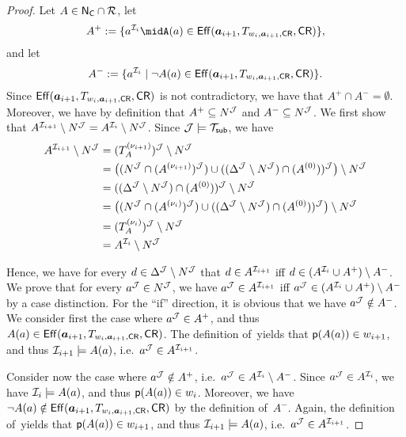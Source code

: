 \begin{proof}
    Let $A\in\mathsf{N_C}\cap\mathcal{R}$, let
    \[A^+:=\{a^{\Imc_i}\mid%
        A(a)\in\Eff(\abf_{i+1},T_{w_i,\abf_{i+1},\CR},\CR)\},\]
    and let
    \[A^-:=\{a^{\Imc_i}\mid%
        \lnot A(a)\in\Eff(\abf_{i+1},T_{w_i,\abf_{i+1},\CR},\CR)\}.\]
    Since $\operatorname{\mathsf{Eff}}(\boldsymbol a_{i+1},T_{w_i,\boldsymbol a_{i+1},\mathsf{CR}},\mathsf{CR})$ is not contradictory, we
    have that $A^+\cap A^-=\emptyset$.  Moreover, we have by definition that
    $A^+\subseteq N^\mathcal{J}$ and $A^-\subseteq N^\mathcal{J}$.
    We first show that
    $A^{\mathcal{I}_{i+1}}\setminus N^\mathcal{J}=A^{\mathcal{I}_i}\setminus N^\mathcal{J}$.  Since
    $\mathcal{J}\models\mathcal{T}_\mathsf{sub}$, we have
    \begin{align*}
        A^{\mathcal{I}_{i+1}}\setminus N^\mathcal{J}
        &=(T_A^{(\nu_{i+1})})^\mathcal{J}\setminus N^\mathcal{J}\\
        &=\bigl((N^\mathcal{J}\cap(A^{(\nu_{i+1})})^\mathcal{J})\cup((\Delta^\mathcal{J}\setminus N^\mathcal{J})\cap(A^{(0)}))^\mathcal{J}\bigr)\setminus N^\mathcal{J}\\
        &=((\Delta^\mathcal{J}\setminus N^\mathcal{J})\cap(A^{(0)}))^\mathcal{J}\setminus N^\mathcal{J}\\
        &=\bigl((N^\mathcal{J}\cap(A^{(\nu_{i})})^\mathcal{J})\cup((\Delta^\mathcal{J}\setminus N^\mathcal{J})\cap(A^{(0)}))^\mathcal{J}\bigr)\setminus N^\mathcal{J}\\
        &=(T_A^{(\nu_{i})})^\mathcal{J}\setminus N^\mathcal{J}\\
        &=A^{\mathcal{I}_i}\setminus N^\mathcal{J}
    \end{align*}

    \noindent
    Hence, we have for every $d\in\Delta^\mathcal{J}\setminus N^\mathcal{J}$ that
    $d\in A^{\mathcal{I}_{i+1}}$ iff $d\in(A^{\mathcal{I}_i}\cup A^+)\setminus A^-$.
    We prove that for every $a^\mathcal{J}\in N^\mathcal{J}$, we have
    $a^\mathcal{J}\in A^{\mathcal{I}_{i+1}}$ iff $a^\mathcal{J}\in(A^{\mathcal{I}_i}\cup A^+)\setminus A^-$
    by a case distinction.
    For the \enquote{if} direction, it is obvious that we have
    $a^\mathcal{J}\notin A^-$.  We consider first the case where $a^\mathcal{J}\in A^+$, and
    thus $A(a)\in\operatorname{\mathsf{Eff}}(\boldsymbol a_{i+1},T_{w_i,\boldsymbol a_{i+1},\mathsf{CR}},\mathsf{CR})$.  The definition
    of~\Deltah yields that $\mathsf{p}(A(a))\in w_{i+1}$, and thus
    $\mathcal{I}_{i+1}\models A(a)$, i.e.~$a^\mathcal{J}\in A^{\mathcal{I}_{i+1}}$.

    Consider now the case where $a^\mathcal{J}\notin A^+$,
    i.e.~$a^\mathcal{J}\in A^{\mathcal{I}_i}\setminus A^-$.  Since $a^\mathcal{J}\in A^{\mathcal{I}_i}$, we
    have $\mathcal{I}_i\models A(a)$, and thus $\mathsf{p}(A(a))\in w_i$.  Moreover, we have
    $\lnot A(a)\notin\operatorname{\mathsf{Eff}}(\boldsymbol a_{i+1},T_{w_i,\boldsymbol a_{i+1},\mathsf{CR}},\mathsf{CR})$ by the
    definition of~$A^-$.  Again, the definition of~\Deltah yields that
    $\mathsf{p}(A(a))\in w_{i+1}$, and thus $\mathcal{I}_{i+1}\models A(a)$,
    i.e.~$a^\mathcal{J}\in A^{\mathcal{I}_{i+1}}$.


\end{proof}

